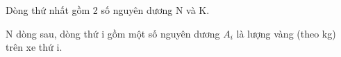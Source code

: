 Dòng thứ nhất gồm 2 số nguyên dương N và K.

N dòng sau, dòng thứ i gồm một số nguyên dương $A_{i}$ là lượng vàng (theo kg) trên xe thứ i.